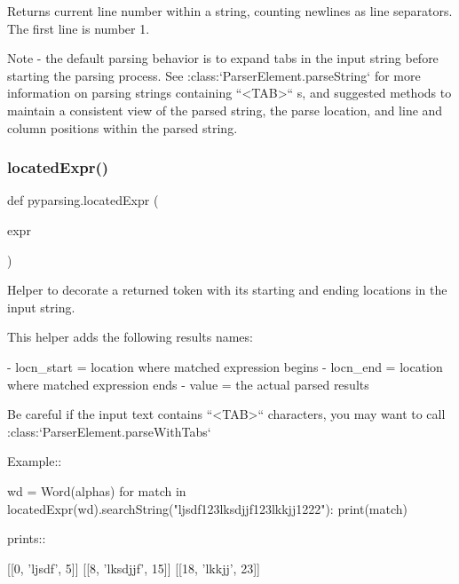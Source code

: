 \begin{DoxyVerb}Returns current line number within a string, counting newlines as line separators.
The first line is number 1.

Note - the default parsing behavior is to expand tabs in the input string
before starting the parsing process.  See :class:`ParserElement.parseString`
for more information on parsing strings containing ``<TAB>`` s, and
suggested methods to maintain a consistent view of the parsed string, the
parse location, and line and column positions within the parsed string.
\end{DoxyVerb}
 \mbox{\label{namespacepyparsing_a745ff2c112643ae0bb8649a56eaf51cf}} 
\subsubsection{\texorpdfstring{located\+Expr()}{locatedExpr()}}
{\footnotesize\ttfamily def pyparsing.\+located\+Expr (\begin{DoxyParamCaption}\item[{}]{expr }\end{DoxyParamCaption})}

\begin{DoxyVerb}Helper to decorate a returned token with its starting and ending
locations in the input string.

This helper adds the following results names:

 - locn_start = location where matched expression begins
 - locn_end = location where matched expression ends
 - value = the actual parsed results

Be careful if the input text contains ``<TAB>`` characters, you
may want to call :class:`ParserElement.parseWithTabs`

Example::

    wd = Word(alphas)
    for match in locatedExpr(wd).searchString("ljsdf123lksdjjf123lkkjj1222"):
        print(match)

prints::

    [[0, 'ljsdf', 5]]
    [[8, 'lksdjjf', 15]]
    [[18, 'lkkjj', 23]]
\end{DoxyVerb}
 \mbox{\label{namespacepyparsing_acd02ec882992514110dd9f188328d5be}} 
